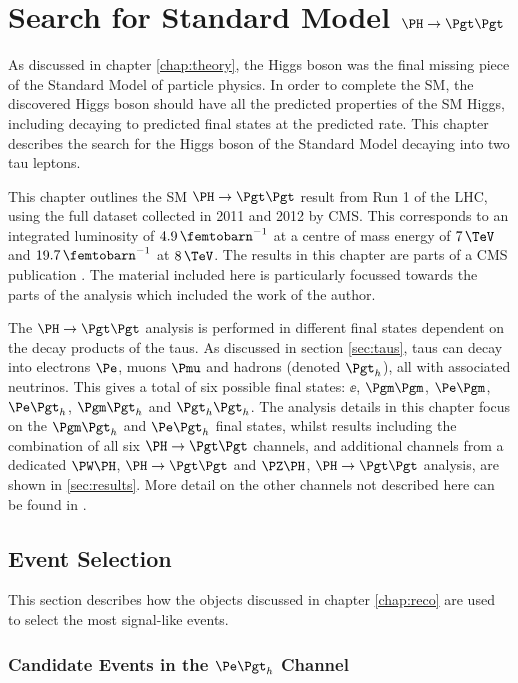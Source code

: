 \chapter{Search for Standard Model $\PH \to \Pgt\Pgt$}
\label{chap:htt-sm}

As discussed in chapter \ref{chap:theory}, the Higgs boson was the final missing 
piece of the Standard Model of particle physics. In order to complete the
\ac{SM}, the discovered Higgs boson should have all the predicted properties of the
\ac{SM} Higgs, including decaying to predicted final states at the predicted rate. This
chapter describes the search for the Higgs boson of the Standard Model 
decaying into two tau leptons.

This chapter outlines the \ac{SM} $\HToTauTau$ result from Run 1 of the \ac{LHC}, using the
full dataset collected in 2011 and 2012 by CMS. This corresponds to an
integrated luminosity of $4.9\,\femtobarn^{-1}$ at a centre of mass energy of $7\,\TeV$ and
$19.7\,\femtobarn^{-1}$ at $8\,\TeV$. The results in this chapter are parts of a CMS publication 
\cite{HIG-13-004}. The material included 
here is particularly focussed towards the parts of the analysis which 
included the work of the author. 

The $\HToTauTau$ analysis is performed in different final states dependent
on the decay products of the taus. As discussed in section
\ref{sec:taus}, taus can decay into electrons $\Pe$,
muons $\Pmu$ and hadrons (denoted $\Pgth$), all with associated neutrinos.
This gives a total of six possible final states: $\ee$, $\mumu$, $\emu$,
$\etau$, $\mutau$ and $\tautau$. The analysis details in this chapter focus on
the $\mutau$ and $\etau$ final states, whilst results including the combination of all
six $\HToTauTau$ channels, and additional channels from a dedicated $\PW\PH$, $\PH\to\Pgt\Pgt$ and
$\PZ\PH$, $\PH\to\Pgt\Pgt$ analysis, are shown in \ref{sec:results}. More detail on the other channels
not described here can be found in \cite{HIG-13-004}. 

\section{Event Selection}
\label{sec:eventSelection}

This section describes how the objects discussed in chapter
\ref{chap:reco} are used to select the most signal-like events. 

\subsection{Candidate Events in the $\etau$ Channel}

